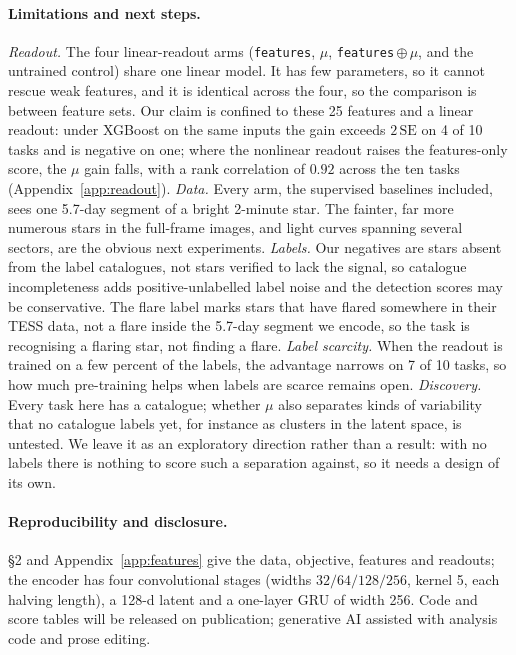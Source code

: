 \documentclass{article}
\begin{document}
\paragraph{\textbf{Limitations and next steps.}} \emph{Readout.} The four linear-readout arms (\texttt{features},
$\mu$, \texttt{features}\,$\oplus\,\mu$, and the untrained control) share one linear model. It has few
parameters, so it cannot rescue weak features, and it is identical across the four, so the comparison
is between feature sets. Our claim is confined to these 25 features and a linear readout: under
XGBoost on the same inputs the gain exceeds $2\,\mathrm{SE}$ on 4 of 10 tasks and is negative on one;
where the nonlinear readout raises the features-only score, the $\mu$ gain falls, with a rank
correlation of $0.92$ across the ten tasks (Appendix~\ref{app:readout}). \emph{Data.} Every arm,
the supervised baselines included, sees one 5.7-day segment of a bright 2-minute star. The fainter,
far more numerous stars in the full-frame images, and light curves spanning several sectors, are the
obvious next experiments. \emph{Labels.} Our
negatives are stars absent from the label catalogues, not stars verified to lack the signal, so
catalogue incompleteness adds positive-unlabelled label noise and the detection scores may be
conservative. The flare label marks stars that have flared somewhere in their TESS data, not a flare inside
the 5.7-day segment we encode, so the task is recognising a flaring star, not finding a flare. \emph{Label scarcity.} When
the readout is trained on a few percent of the labels, the advantage narrows on 7 of 10 tasks, so how
much pre-training helps when labels are scarce remains open. \emph{Discovery.} Every task here has a
catalogue; whether $\mu$ also separates kinds of variability that no catalogue labels yet, for instance
as clusters in the latent space, is untested. We leave it as an exploratory direction rather than a
result: with no labels there is nothing to score such a separation against, so it needs a design of
its own.

\paragraph{Reproducibility and disclosure.} \S2 and Appendix~\ref{app:features} give the data,
objective, features and readouts; the encoder has four convolutional stages (widths $32/64/128/256$,
kernel 5, each halving length), a 128-d latent and a one-layer GRU of width 256. Code and score
tables will be released on publication; generative AI assisted with analysis code and prose editing.
\end{document}
